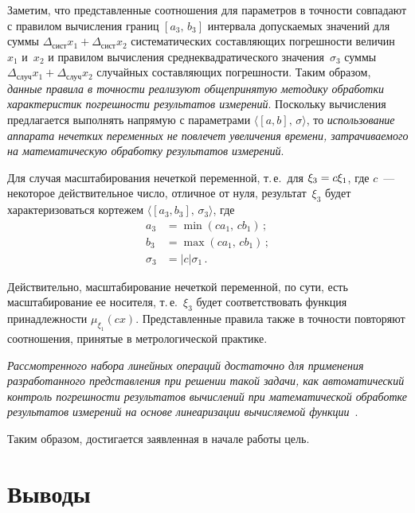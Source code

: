 \begin{multicols}{2}
  Заметим, что представленные соотношения для параметров в точности 
совпадают с правилом вы\-чис\-ле\-ния границ $[a_3,\,b_3]$ интервала допускаемых 
значений для суммы $\Delta_{\mathrm{сист}}x_1+\Delta_{\mathrm{сист}}x_2$ 
систематических составляющих погрешности величин~$x_1$ и~$x_2$ и 
правилом вычисления среднеквадратического значения~$\sigma_3$ суммы 
$\Delta_{\mathrm{случ}}x_1+\Delta_{\mathrm{случ}}x_2$ случайных 
составляющих погрешности. Таким образом, \textit{данные правила в точности 
реализуют общепринятую методику обработки характеристик по\-греш\-ности 
результатов измерений}. Поскольку вычисления предлагается выполнять 
напрямую с параметрами $\langle [a,b],\,\sigma\rangle$, то \textit{использование 
аппарата нечетких переменных не повлечет увеличения времени, 
затрачиваемого на математическую обработку результатов измерений}.
  
  Для случая масштабирования нечеткой переменной, т.\,е.\ для 
$\xi_3\hm=c\xi_1$, где $c$~--- некоторое действительное число, отличное от 
нуля, результат~$\xi_3$ будет характеризоваться кортежем $\langle 
[a_3,b_3],\,\sigma_3\rangle$, где
  \begin{align*}
  a_3&=\min\left( ca_1,\,cb_1\right)\,;\\
  b_3&=\max\left( ca_1,\,cb_1\right)\,;\\
  \sigma_3&=\vert c\vert \sigma_1\,.
  \end{align*}
  
  Действительно, масштабирование нечеткой переменной, по сути, есть 
масштабирование ее носителя, т.\,е.~$\xi_3$ будет соответствовать функция 
принадлежности $\mu_{\xi_1}(c x)$. Представленные правила также в 
точности повторяют соотношения, принятые в метрологической практике.
  
  \textit{Рассмотренного набора линейных операций достаточно для 
применения разработанного представления при решении такой задачи, как 
автоматический контроль погрешности результатов вычислений при 
математической обработке результатов измерений на основе линеаризации 
вычисляемой функции}~\cite{16sem}.
  
  Таким образом, достигается заявленная в начале работы цель.
  
\section{Выводы}
     

\end{multicols}
